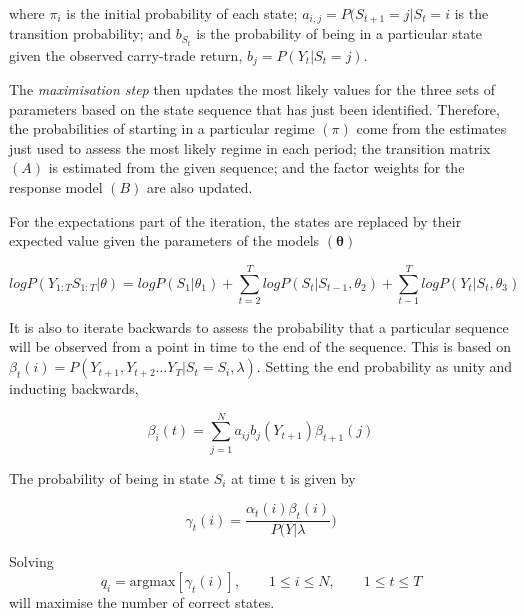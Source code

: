 \documentclass[12pt, a4paper, oneside]{article}\usepackage[]{graphicx}\usepackage[]{color}
\begin{document}
where $\pi_i$ is the initial probability of each state; $a_{i,j} = P(S_{t+1} = j| S_t = i$ is the transition probability; and $b_{S_t}$ is the probability of being in a particular state given the observed carry-trade return, $b_j = P(Y_t|S_t = j)$.

The \emph{maximisation step} then updates the most likely values for the three sets of parameters based on the state sequence that has just been identified. Therefore, the probabilities of starting in a particular regime $(\pi)$ come from the estimates just used to assess the most likely regime in each period; the transition matrix $(A)$ is estimated from the given sequence; and the factor weights for the response model $(B)$ are also updated. 

For the expectations part of the iteration, the states are replaced by their expected value given the parameters of the models $(\mathbf{\theta})$

\begin{equation} 
log P(Y_{1:T}S_{1:T}| \theta) = log P(S_1|\theta_1) + \sum_{t=2}^T log P(S_t|S_{t-1}, \theta_2) + \sum_{t-1}^T log P(Y_t|S_t, \theta_3)
\end{equation}

It is also to iterate backwards to assess the probability that a particular sequence will be observed from a point in time to the end of the sequence.  This is based on $\beta_t(i) = P(Y_{t+1}, Y_{t+2}\dots Y_T| S_t = S_i, \lambda)$. Setting the end probability as unity and inducting backwards, 

\begin{equation} 
\beta_i(t) = \sum_{j = 1}^N a_{ij}b_j(Y_{t+1})\beta_{t+1}(j)
\end{equation}

The probability of being in state $S_i$ at time t is given by 

\begin{equation}
\gamma_t(i) = \frac{\alpha_t(i)\beta_t(i)}{P(Y|\lambda})
\end{equation}

Solving
\begin{equation}
q_i = \text{argmax} [\gamma_t(i)], \qquad 1 \leq i \leq N, \qquad 1 \leq t \leq T  
\end{equation}
will maximise the number of correct states. 

\end{document}

